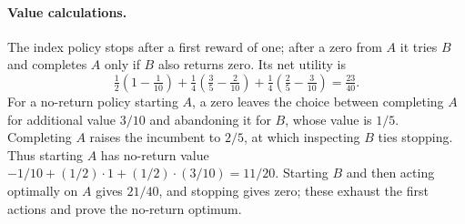 \paragraph{Value calculations.}
The index policy stops after a first reward of one; after a zero from $A$ it
tries $B$ and completes $A$ only if $B$ also returns zero. Its net utility is
\[
 \tfrac12(1-\tfrac1{10})
 +\tfrac14(\tfrac35-\tfrac2{10})
 +\tfrac14(\tfrac25-\tfrac3{10})=\tfrac{23}{40}.
\]
For a no-return policy starting $A$, a zero leaves the choice between completing
$A$ for additional value $3/10$ and abandoning it for $B$, whose value is $1/5$.
Completing $A$ raises the incumbent to $2/5$, at which inspecting $B$ ties stopping.
Thus starting $A$ has no-return value
$-1/10+(1/2)\cdot1+(1/2)\cdot(3/10)=11/20$.
Starting $B$ and then acting optimally on $A$ gives $21/40$, and stopping gives zero;
these exhaust the first actions and prove the no-return optimum.
